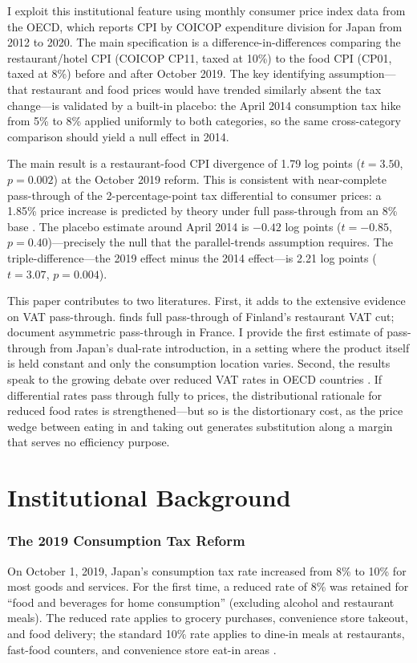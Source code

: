 \documentclass[12pt]{article}
\begin{document}
I exploit this institutional feature using monthly consumer price index data from the OECD, which reports CPI by COICOP expenditure division for Japan from 2012 to 2020. The main specification is a difference-in-differences comparing the restaurant/hotel CPI (COICOP CP11, taxed at 10\%) to the food CPI (CP01, taxed at 8\%) before and after October 2019. The key identifying assumption---that restaurant and food prices would have trended similarly absent the tax change---is validated by a built-in placebo: the April 2014 consumption tax hike from 5\% to 8\% applied uniformly to both categories, so the same cross-category comparison should yield a null effect in 2014.

The main result is a restaurant-food CPI divergence of 1.79 log points ($t = 3.50$, $p = 0.002$) at the October 2019 reform. This is consistent with near-complete pass-through of the 2-percentage-point tax differential to consumer prices: a 1.85\% price increase is predicted by theory under full pass-through from an 8\% base \citep{carbonnier2007pays}. The placebo estimate around April 2014 is $-0.42$ log points ($t = -0.85$, $p = 0.40$)---precisely the null that the parallel-trends assumption requires. The triple-difference---the 2019 effect minus the 2014 effect---is 2.21 log points ($t = 3.07$, $p = 0.004$).

This paper contributes to two literatures. First, it adds to the extensive evidence on VAT pass-through. \citet{kosonen2015more} finds full pass-through of Finland's restaurant VAT cut; \citet{benzarti2019really} document asymmetric pass-through in France. I provide the first estimate of pass-through from Japan's dual-rate introduction, in a setting where the product itself is held constant and only the consumption location varies. Second, the results speak to the growing debate over reduced VAT rates in OECD countries \citep{cnossen2020value}. If differential rates pass through fully to prices, the distributional rationale for reduced food rates is strengthened---but so is the distortionary cost, as the price wedge between eating in and taking out generates substitution along a margin that serves no efficiency purpose.

\section{Institutional Background}

\subsubsection*{The 2019 Consumption Tax Reform} On October 1, 2019, Japan's consumption tax rate increased from 8\% to 10\% for most goods and services. For the first time, a reduced rate of 8\% was retained for ``food and beverages for home consumption'' (excluding alcohol and restaurant meals). The reduced rate applies to grocery purchases, convenience store takeout, and food delivery; the standard 10\% rate applies to dine-in meals at restaurants, fast-food counters, and convenience store eat-in areas \citep{mof2019tax}.
\end{document}

